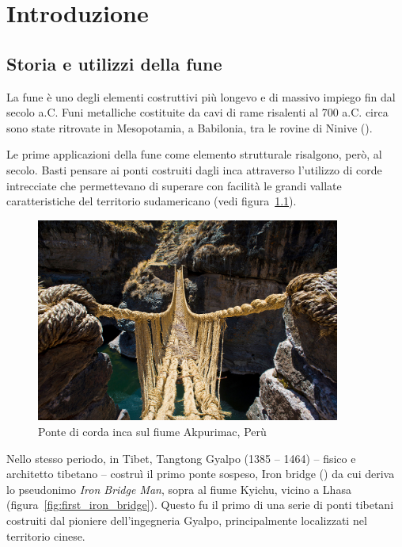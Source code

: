\chapter{Introduzione}
\section{Storia e utilizzi della fune}
La fune è uno degli elementi costruttivi più longevo e di massivo impiego fin dal   secolo a.C. Funi metalliche costituite da cavi di rame risalenti al 700 a.C. circa sono state ritrovate in Mesopotamia, a Babilonia, tra le rovine di Ninive (\cite{costello:fune}).

Le prime applicazioni della fune come elemento strutturale risalgono, però, al  secolo.
Basti pensare ai ponti costruiti dagli inca attraverso l'utilizzo di corde intrecciate che permettevano di superare con facilità le grandi vallate caratteristiche del territorio sudamericano (vedi figura~\ref{fig:ponte_inca}).

\begin{figure}
	\centering
	\includegraphics[width=10cm]{Immagini/Ponte_Inca}
	\caption{Ponte di corda inca sul fiume Akpurimac, Perù}	
	\label{fig:ponte_inca}
\end{figure}

Nello stesso periodo, in Tibet, Tangtong Gyalpo (1385 -- 1464) -- fisico e architetto tibetano -- costruì il primo ponte sospeso, Iron bridge (\cite{cyrus:ponte}) da cui deriva lo pseudonimo \textit{Iron Bridge Man}, sopra al fiume Kyichu, vicino a Lhasa (figura~\ref{fig:first_iron_bridge}). Questo fu il primo di una serie di ponti tibetani costruiti dal pioniere dell'ingegneria Gyalpo, principalmente localizzati nel territorio cinese.

